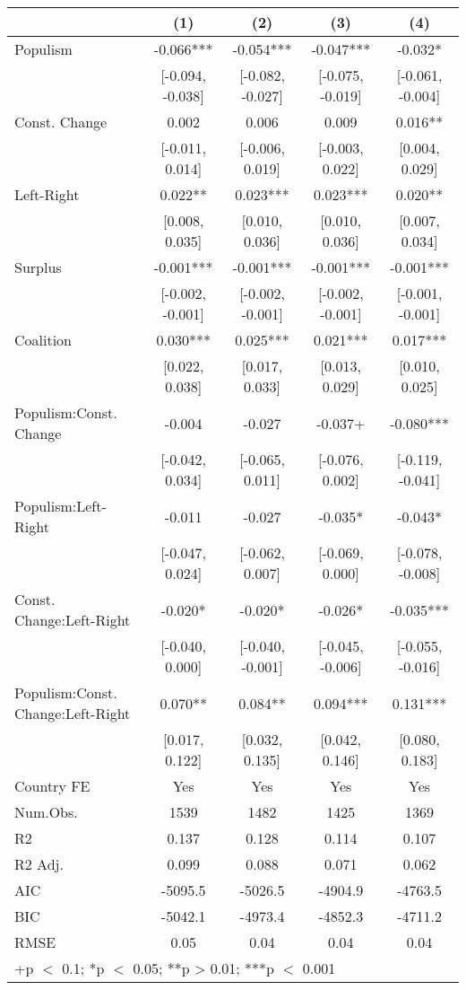 \begin{table}
\centering\centering\centering
\begin{tabular}[t]{lcccc}
\toprule
  & (1) & (2) & (3) & (4)\\
\midrule
Populism & -0.066*** & -0.054*** & -0.047*** & -0.032*\\
 & {}[-0.094, -0.038] & {}[-0.082, -0.027] & {}[-0.075, -0.019] & {}[-0.061, -0.004]\\
Const. Change & 0.002 & 0.006 & 0.009 & 0.016**\\
 & {}[-0.011, 0.014] & {}[-0.006, 0.019] & {}[-0.003, 0.022] & {}[0.004, 0.029]\\
Left-Right & 0.022** & 0.023*** & 0.023*** & 0.020**\\
 & {}[0.008, 0.035] & {}[0.010, 0.036] & {}[0.010, 0.036] & {}[0.007, 0.034]\\
Surplus & -0.001*** & -0.001*** & -0.001*** & -0.001***\\
 & {}[-0.002, -0.001] & {}[-0.002, -0.001] & {}[-0.002, -0.001] & {}[-0.001, -0.001]\\
Coalition & 0.030*** & 0.025*** & 0.021*** & 0.017***\\
 & {}[0.022, 0.038] & {}[0.017, 0.033] & {}[0.013, 0.029] & {}[0.010, 0.025]\\
Populism:Const. Change & -0.004 & -0.027 & -0.037+ & -0.080***\\
 & {}[-0.042, 0.034] & {}[-0.065, 0.011] & {}[-0.076, 0.002] & {}[-0.119, -0.041]\\
Populism:Left-Right & -0.011 & -0.027 & -0.035* & -0.043*\\
 & {}[-0.047, 0.024] & {}[-0.062, 0.007] & {}[-0.069, 0.000] & {}[-0.078, -0.008]\\
Const. Change:Left-Right & -0.020* & -0.020* & -0.026* & -0.035***\\
 & {}[-0.040, 0.000] & {}[-0.040, -0.001] & {}[-0.045, -0.006] & {}[-0.055, -0.016]\\
Populism:Const. Change:Left-Right & 0.070** & 0.084** & 0.094*** & 0.131***\\
 & {}[0.017, 0.122] & {}[0.032, 0.135] & {}[0.042, 0.146] & {}[0.080, 0.183]\\
\midrule
Country FE & Yes & Yes & Yes & Yes\\
Num.Obs. & 1539 & 1482 & 1425 & 1369\\
R2 & 0.137 & 0.128 & 0.114 & 0.107\\
R2 Adj. & 0.099 & 0.088 & 0.071 & 0.062\\
AIC & -5095.5 & -5026.5 & -4904.9 & -4763.5\\
BIC & -5042.1 & -4973.4 & -4852.3 & -4711.2\\
RMSE & 0.05 & 0.04 & 0.04 & 0.04\\
\bottomrule
\multicolumn{5}{l}{\rule{0pt}{1em}+p $<$ 0.1; *p $<$ 0.05; **p > 0.01; ***p $<$ 0.001}\\
\end{tabular}
\end{table}
